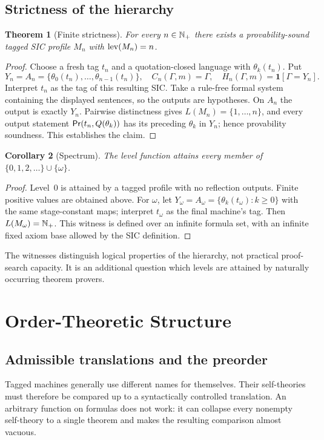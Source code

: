\documentclass[11pt,letterpaper]{article}
\newtheorem{theorem}{Theorem}[section]\newtheorem{proposition}[theorem]{Proposition}\newtheorem{lemma}[theorem]{Lemma}\newtheorem{corollary}[theorem]{Corollary}\newtheorem{conjecture}[theorem]{Conjecture}\theoremstyle{definition}\newtheorem{definition}[theorem]{Definition}\newtheorem{example}[theorem]{Example}\newtheorem{remark}[theorem]{Remark}
\begin{document}
\subsection{Strictness of the hierarchy}
\begin{theorem}[Finite strictness]
For every $n\in\mathbb N_{+}$ there exists a provability-sound tagged SIC profile $M_n$ with $\operatorname{lev}(M_n)=n$.
\end{theorem}
\begin{proof}
Choose a fresh tag $t_n$ and a quotation-closed language with $\theta_k(t_n)$. Put
\[
Y_n=A_n=\{\theta_0(t_n),\ldots,\theta_{n-1}(t_n)\},\quad C_n(\Gamma,m)=\Gamma,\quad H_n(\Gamma,m)=\mathbf 1[\Gamma=Y_n].
\]
Interpret $t_n$ as the tag of this resulting SIC. Take a rule-free formal system containing the displayed sentences, so the outputs are hypotheses. On $A_n$ the output is exactly $Y_n$. Pairwise distinctness gives $L(M_n)=\{1,\ldots,n\}$, and every output statement $\mathsf{Pr}(t_n,Q(\theta_k))$ has its preceding $\theta_k$ in $Y_n$; hence provability soundness. This establishes the claim.
\end{proof}
\begin{corollary}[Spectrum]
The level function attains every member of $\{0,1,2,\ldots\}\cup\{\omega\}$.
\end{corollary}
\begin{proof}
Level~0 is attained by a tagged profile with no reflection outputs. Finite positive values are obtained above. For $\omega$, let $Y_\omega=A_\omega=\{\theta_k(t_\omega):k\ge0\}$ with the same stage-constant maps; interpret $t_\omega$ as the final machine's tag. Then $L(M_\omega)=\mathbb N_{+}$. This witness is defined over an infinite formula set, with an infinite fixed axiom base allowed by the SIC definition.
\end{proof}
The witnesses distinguish logical properties of the hierarchy, not practical proof-search capacity. It is an additional question which levels are attained by naturally occurring theorem provers.

\section{Order-Theoretic Structure}
\subsection{Admissible translations and the preorder}
Tagged machines generally use different names for themselves. Their self-theories must therefore be compared up to a syntactically controlled translation. An arbitrary function on formulas does not work: it can collapse every nonempty self-theory to a single theorem and makes the resulting comparison almost vacuous.
\end{document}
